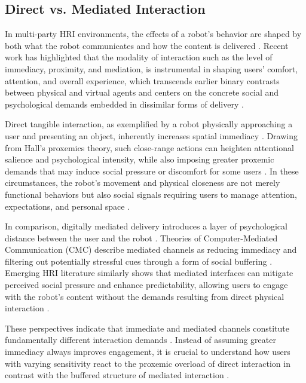 \documentclass[sigconf,screen]{acmart-tagged}
\begin{document}
\vspace{-5pt}
\subsection{Direct vs. Mediated Interaction}
In multi-party HRI environments, the effects of a robot's behavior are shaped by both what the robot communicates and how the content is delivered \cite{10.1145/3643803, bazzano2018human, rodriguez2015bellboy, li2015benefit}. Recent work has highlighted that the modality of interaction such as the level of immediacy, proximity, and mediation, is instrumental in shaping users' comfort, attention, and overall experience, which transcends earlier binary contrasts between physical and virtual agents and centers on the concrete social and psychological demands embedded in dissimilar forms of delivery \cite{leichtmann2022personal, tsai2025assistive, gittens2024remote, zu2024let}.

Direct tangible interaction, as exemplified by a robot physically approaching a user and presenting an object, inherently increases spatial immediacy \cite{rahmah2025modeling, hall1966hidden, leichtmann2022personal, tsai2025assistive}. Drawing from Hall’s proxemics theory, such close-range actions can heighten attentional salience and psychological intensity, while also imposing greater proxemic demands that may induce social pressure or discomfort for some users \cite{hall1966hidden, rodriguez2015bellboy}. In these circumstances, the robot's movement and physical closeness are not merely functional behaviors but also social signals requiring users to manage attention, expectations, and personal space \cite{li2015benefit, rodriguez2015bellboy}.

In comparison, digitally mediated delivery introduces a layer of psychological distance between the user and the robot \cite{xu2018investigating, gittens2024remote, walther1996computer}. Theories of Computer-Mediated Communication (CMC) describe mediated channels as reducing immediacy and filtering out potentially stressful cues through a form of social buffering \cite{walther1996computer, walther2011theories}. Emerging HRI literature similarly shows that mediated interfaces can mitigate perceived social pressure and enhance predictability, allowing users to engage with the robot's content without the demands resulting from direct physical interaction \cite{gittens2024remote, xu2018investigating}.

These perspectives indicate that immediate and mediated channels constitute fundamentally different interaction demands \cite{li2015benefit, walther1996computer}. Instead of assuming greater immediacy always improves engagement, it is crucial to understand how users with varying sensitivity react to the proxemic overload of direct interaction in contrast with the buffered structure of mediated interaction \cite{tsai2025assistive, zojaji2025impact, fitter2020closeness, mumm2011human}.
\end{document}
